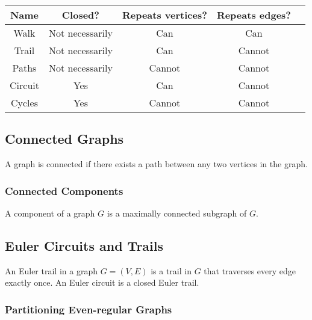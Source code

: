 \begin{center}
    \begin{tabular} {| c | c | c | c | c |}
        \hline
        Name & Closed? & Repeats vertices? & Repeats edges? \\
        \hline \hline
        Walk        & Not necessarily & Can    & Can    \\ \hline
        Trail       & Not necessarily & Can    & Cannot \\ \hline
        Paths       & Not necessarily & Cannot & Cannot \\ \hline
        Circuit     & Yes             & Can    & Cannot \\ \hline
        Cycles      & Yes             & Cannot & Cannot \\ \hline
    \end{tabular}
\end{center}

\subsection{Connected Graphs}

A graph is connected if there exists a path between any two vertices 
in the graph.

\subsubsection{Connected Components}

A component of a graph $G$ is a maximally connected subgraph of $G$.

\subsection{Euler Circuits and Trails}

An Euler trail in a graph $G = (V, E)$ is a trail in $G$ that traverses every edge
exactly once. An Euler circuit is a closed Euler trail.

\subsubsection{Partitioning Even-regular Graphs} \label{eulerpart}

